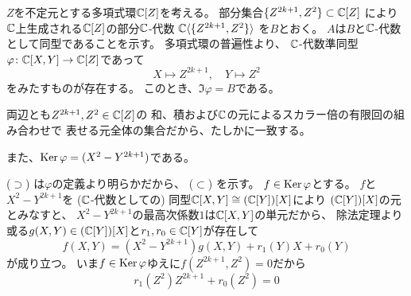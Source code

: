 \documentclass[report]{jlreq}
\begin{document}
\begin{problem}[代数学II 3.37]
    \TODO{}
\end{problem}

\begin{answer}
    \TODO{}
\end{answer}



\begin{answer}
    $Z$を不定元とする多項式環$\mathbb{C}[Z]$を考える。
    部分集合$\{ Z^{2k + 1}, Z^2 \} \subset \mathbb{C}[Z]$
    により$\mathbb{C}$上生成される$\mathbb{C}[Z]$の部分$\mathbb{C}$-代数
    $\mathbb{C}\langle \{ Z^{2k + 1}, Z^2 \} \rangle$
    を$B$とおく。
    $A$は$B$と$\mathbb{C}$-代数として同型であることを示す。
    多項式環の普遍性より、
    $\mathbb{C}$-代数準同型$\varphi \colon \mathbb{C}[X, Y] \to \mathbb{C}[Z]$であって
    \begin{equation}
        X \mapsto Z^{2k + 1}, \quad Y \mapsto Z^2
    \end{equation}
    をみたすものが存在する。
    このとき、$\Im \varphi = B$である。
    \begin{innerproof}
        両辺とも$Z^{2k + 1}, Z^2 \in \mathbb{C}[Z]$の
        和、積および$\mathbb{C}$の元によるスカラー倍の有限回の組み合わせで
        表せる元全体の集合だから、たしかに一致する。
    \end{innerproof}
    また、$\operatorname{\mathrm{Ker}} \varphi = (X^2 - Y^{2k + 1})$である。
    \begin{innerproof}
        ($\supset$) は$\varphi$の定義より明らかだから、
        ($\subset$) を示す。
        $f \in \operatorname{\mathrm{Ker}} \varphi$とする。
        $f$と$X^2 - Y^{2k + 1}$を ($\mathbb{C}$-代数としての) 同型$\mathbb{C}[X, Y] \cong (\mathbb{C}[Y])[X]$により
        $(\mathbb{C}[Y])[X]$の元とみなすと、
        $X^2 - Y^{2k + 1}$の最高次係数$1$は$\mathbb{C}[X, Y]$の単元だから、
        除法定理より
        或る$g(X, Y) \in  (\mathbb{C}[Y])[X]$と$r_1, r_0 \in \mathbb{C}[Y]$が存在して
        \begin{equation}
            f(X, Y) = (X^2 - Y^{2k + 1}) g(X, Y)
                + r_1(Y) X + r_0(Y)
        \end{equation}
        が成り立つ。
        いま$f \in \operatorname{\mathrm{Ker}} \varphi$ゆえに$f(Z^{2k + 1}, Z^2) = 0$だから
        \begin{equation}
            r_1(Z^2) Z^{2k + 1} + r_0(Z^2) = 0

\end{equation}
\end{innerproof}
\end{answer}
\end{document}
